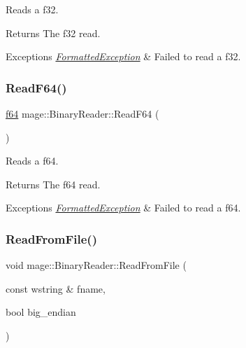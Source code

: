 Reads a {\ttfamily f32}.

\begin{DoxyReturn}{Returns}
The {\ttfamily f32} read. 
\end{DoxyReturn}

\begin{DoxyExceptions}{Exceptions}
{\em \hyperlink{structmage_1_1_formatted_exception}{Formatted\+Exception}} & Failed to read a {\ttfamily f32}. \\
\hline
\end{DoxyExceptions}
\hypertarget{classmage_1_1_binary_reader_a5d3e1add9e6108f71f69e770983f4188}{}\label{classmage_1_1_binary_reader_a5d3e1add9e6108f71f69e770983f4188} 
\subsubsection{\texorpdfstring{Read\+F64()}{ReadF64()}}
{\footnotesize\ttfamily \hyperlink{namespacemage_ab935747c6941320bd6214b5a5f265b09}{f64} mage\+::\+Binary\+Reader\+::\+Read\+F64 (\begin{DoxyParamCaption}{ }\end{DoxyParamCaption})\hspace{0.3cm}{\ttfamily [protected]}}

Reads a {\ttfamily f64}.

\begin{DoxyReturn}{Returns}
The {\ttfamily f64} read. 
\end{DoxyReturn}

\begin{DoxyExceptions}{Exceptions}
{\em \hyperlink{structmage_1_1_formatted_exception}{Formatted\+Exception}} & Failed to read a {\ttfamily f64}. \\
\hline
\end{DoxyExceptions}
\hypertarget{classmage_1_1_binary_reader_aa9cc5e2bd41cd5ae5ee421ee9a1e10b2}{}\label{classmage_1_1_binary_reader_aa9cc5e2bd41cd5ae5ee421ee9a1e10b2} 
\subsubsection{\texorpdfstring{Read\+From\+File()}{ReadFromFile()}}
{\footnotesize\ttfamily void mage\+::\+Binary\+Reader\+::\+Read\+From\+File (\begin{DoxyParamCaption}\item[{const wstring \&}]{fname,  }\item[{bool}]{big\+\_\+endian }\end{DoxyParamCaption})}

